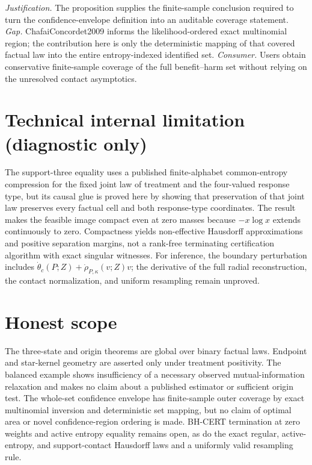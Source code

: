 \documentclass{article}
\begin{document}
\par\smallskip\noindent \textit{Justification.} The proposition supplies the finite-sample conclusion required to turn the confidence-envelope definition into an auditable coverage statement. \textit{Gap.} ChafaiConcordet2009 informs the likelihood-ordered exact multinomial region; the contribution here is only the deterministic mapping of that covered factual law into the entire entropy-indexed identified set. \textit{Consumer.} Users obtain conservative finite-sample coverage of the full benefit--harm set without relying on the unresolved contact asymptotics.

\section*{Technical internal limitation (diagnostic only)}

The support-three equality uses a published finite-alphabet common-entropy compression for the fixed joint law of treatment and the four-valued response type, but its causal glue is proved here by showing that preservation of that joint law preserves every factual cell and both response-type coordinates. The result makes the feasible image compact even at zero masses because \(-x\log x\) extends continuously to zero. Compactness yields non-effective Hausdorff approximations and positive separation margins, not a rank-free terminating certification algorithm with exact singular witnesses. For inference, the boundary perturbation includes \(\dot\theta_c(P;Z)+\dot\rho_{P,\kappa}(v;Z)v\); the derivative of the full radial reconstruction, the contact normalization, and uniform resampling remain unproved.

\section{Honest scope}

The three-state and origin theorems are global over binary factual laws. Endpoint and star-kernel geometry are asserted only under treatment positivity. The balanced example shows insufficiency of a necessary observed mutual-information relaxation and makes no claim about a published estimator or sufficient origin test. The whole-set confidence envelope has finite-sample outer coverage by exact multinomial inversion and deterministic set mapping, but no claim of optimal area or novel confidence-region ordering is made. BH-CERT termination at zero weights and active entropy equality remains open, as do the exact regular, active-entropy, and support-contact Hausdorff laws and a uniformly valid resampling rule.
\end{document}
